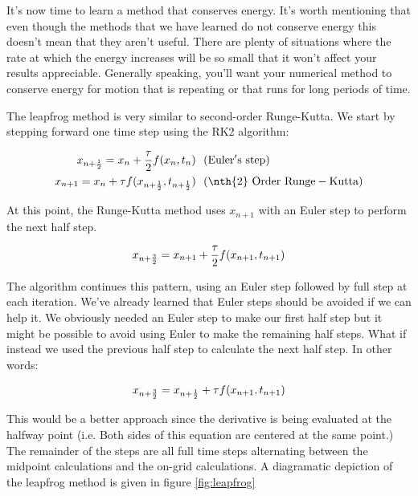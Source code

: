 It's now time to learn a method that conserves energy.  It's worth
mentioning that even though the methods that we have learned do not
conserve energy this doesn't mean that they aren't useful.  There are
plenty of situations where the rate at which the energy increases will
be so small that it won't affect your results appreciable.  Generally
speaking, you'll want your numerical method to conserve energy for
motion that is repeating or that runs for long periods of time.

The leapfrog method is very similar to second-order Runge-Kutta.  We
start by stepping forward one time step using the RK2 algorithm:

\begin{align}
x_{n + {1\over 2}} = x_n + {\tau\over 2} f(x_n,t_n)& ~~\mathrm{(Euler's~ step)}\label{eq:leapfrogOne}\\
x_{n + 1} = x_n + \tau f(x_{n + {1\over 2}},t_{n + {1\over 2}}) \label{eq:leapfrogTwo}&
~~\mathrm{(\nth{2} ~Order~ Runge-Kutta)}
\end{align}

At this point, the Runge-Kutta method uses $x_{n+1}$ with an Euler step to perform the
next half step.

\begin{align}
x_{n + {3\over 2}} = x_{n+1} + {\tau\over 2} f(x_{n+1},t_{n+1})&\label{eq:leapfrogThree}\\
\end{align}

The algorithm continues this pattern, using an Euler step followed by full step at
each iteration.  We've already learned that Euler steps should be
avoided if we can help it.  We obviously needed an Euler step to 
make our first half step but it might be possible to avoid using Euler to
make the remaining half steps.  What if instead we used the previous
half step to calculate the next half step.  In other words:

\begin{align}
x_{n + {3\over 2}} = x_{n+{1\over 2}} + \tau f(x_{n+1},t_{n+1})&\\
\end{align}

This would be a better approach since the derivative is
being evaluated at the halfway point (i.e.  Both sides of this
equation are centered at the same point.) The remainder of the steps
are all full time steps alternating between the midpoint calculations
and the on-grid calculations. A diagramatic depiction of
the leapfrog method is given in figure \ref{fig:leapfrog}



